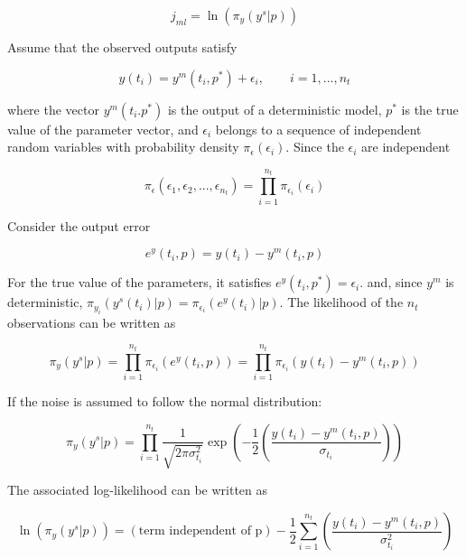 \documentclass[]{scrartcl}
\begin{document}
\begin{equation}
	j_{ml} = \ln ( \pi_y (y^s|p) )
\end{equation}

Assume that the observed outputs satisfy 

\begin{equation}
	y(t_i) = y^m(t_i, p^*) + \epsilon_i, \qquad i=1,...,n_t
\end{equation}

where the vector $y^m(t_i. p^*)$ is the output of a deterministic model, $p^*$ is the true value of the parameter vector, and $\epsilon_i$ belongs to a sequence of independent random variables with probability density $\pi_{\epsilon}(\epsilon_i)$. Since the $\epsilon_i$ are independent

\begin{equation}
	\pi_{\epsilon}(\epsilon_1, \epsilon_2, ..., \epsilon_{n_t}) = \prod_{i=1}^{n_t} \pi_{\epsilon_i}(\epsilon_i)
\end{equation}

Consider the output error

\begin{equation}
	e^y(t_i, p) = y(t_i) - y^m(t_i, p)
\end{equation}

For the true value of the parameters, it satisfies $e^y(t_i, p^*)=\epsilon_i$. and, since $y^m$ is deterministic, $\pi_{y_i} (y^s(t_i)|p) = \pi_{\epsilon_i} (e^y(t_i)|p)$. The likelihood of the $n_t$ observations can be written as

\begin{equation}
	\pi_y (y^s|p) = \prod_{i=1}^{n_t} \pi_{\epsilon_i}(e^y(t_i,p)) =  \prod_{i=1}^{n_t} \pi_{\epsilon_i}(y(t_i) - y^m(t_i, p))
\end{equation}

If the noise is assumed to follow the normal distribution:

\begin{equation}
	\pi_y (y^s|p) = \prod_{i=1}^{n_t} \frac{1}{ \sqrt{2\pi\sigma_{t_i}^2} } \exp \left( -\frac{1}{2} \left( \frac{y(t_i) - y^m(t_i, p)}{\sigma_{t_i}} \right) \right)
\end{equation}

The associated log-likelihood can be written as

\begin{equation}
	\ln (\pi_y (y^s|p)) = (\text{term independent of p}) - \frac{1}{2} \sum_{i=1}^{n_t}  \left( \frac{y(t_i) - y^m(t_i, p)}{\sigma_{t_i}^2} \right)
\end{equation}
\end{document}

